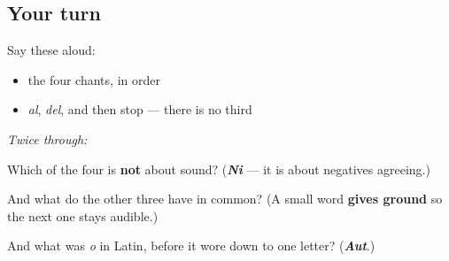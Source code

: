 \subsection*{Your turn}
Say these aloud:

\begin{itemize}
\raggedright
  \item the four chants, in order
  \item \emph{al}, \emph{del}, and then stop — there is no third
\end{itemize}

\emph{Twice through:}

\begin{tcolorbox}[breakable,colback=teal!4,colframe=teal!35!black,title={Before you move on}]
Which of the four is \textbf{not} about sound? (\emph{\textbf{Ni}} — it is about negatives agreeing.)

And what do the other three have in common? (A small word \textbf{gives ground} so the next one stays audible.)

And what was \emph{o} in Latin, before it wore down to one letter? (\emph{\textbf{Aut}}.)
\end{tcolorbox}
